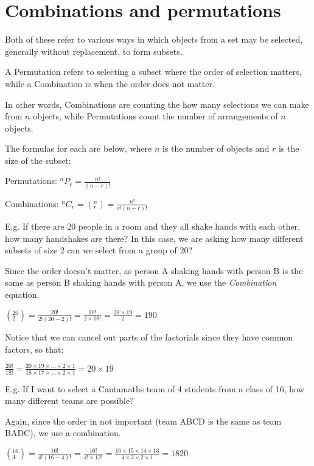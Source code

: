 \documentclass[../main.tex]{subfiles}
\begin{document}
\section{Combinations and permutations}
Both of these refer to various ways in which objects from a set may be selected, generally without replacement, to form subsets.

A Permutation refers to selecting a subset where the order of selection matters, while a Combination is when the order does not matter.

In other words, Combinations are counting the how many selections we can make from \(n\) objects, while Permutations count the number of arrangements of \(n\) objects.

The formulas for each are below, where \(n\) is the number of objects and \(r\) is the size of the subset:

Permutations: \(^nP_r=\frac{n!}{(n-r)!}\)

Combinations: \(^nC_r=(_r^n)=\frac{n!}{r!(n-r)!}\)

\noindent E.g. If there are 20 people in a room and they all shake hands with each other, how many handshakes are there?
In this case, we are asking how many different subsets of size 2 can we select from a group of 20?

Since the order doesn't matter, as person A shaking hands with person B is the same as person B shaking hands with person A, we use the \textit{Combination} equation.

\((_2^{20})=\frac{20!}{2!(20-2)!}=\frac{20!}{2\times 18!}=\frac{20\times19}{2}=190\)

Notice that we can cancel out parts of the factorials since they have common factors, so that:

\(\frac{20!}{18!}=\frac{20\times 19\times ... \times 2 \times 1}{18 \times 17 \times ... \times 2 \times 1} = 20 \times 19\)

E.g. If I want to select a Cantamaths team of 4 students from a class of 16, how many different teams are possible?

Again, since the order in not important (team ABCD is the same as team BADC), we use a combination.

\((_4^{16})=\frac{16!}{4!(16-4)!}=\frac{16!}{4!\times 12!}=\frac{16\times 15\times 14\times 13}{4\times 3\times 2\times 1}=1820\)
\pagebreak
\end{document}
